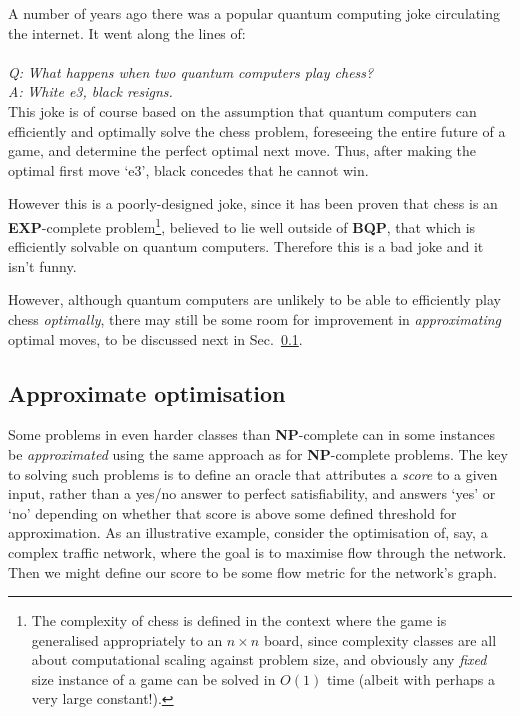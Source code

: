 A number of years ago there was a popular quantum computing joke circulating the internet. It went along the lines of:
\\
\\
\textit{Q:\,\,What happens when two quantum computers play chess?}\\
\textit{A:\,\,White e3, black resigns.}
\\

This joke is of course based on the assumption that quantum computers can efficiently and optimally solve the chess problem, foreseeing the entire future of a game, and determine the perfect optimal next move. Thus, after making the optimal first move `e3', black concedes that he cannot win.

However this is a poorly-designed joke, since it has been proven that chess is an \textbf{EXP}-complete problem\footnote{The complexity of chess is defined in the context where the game is generalised appropriately to an \mbox{$n\times n$} board, since complexity classes are all about computational scaling against problem size, and obviously any \textit{fixed} size instance of a game can be solved in $O(1)$ time (albeit with perhaps a very large constant!).}, believed to lie well outside of \textbf{BQP}, that which is efficiently solvable on quantum computers. Therefore this is a bad joke and it isn't funny.

However, although quantum computers are unlikely to be able to efficiently play chess \textit{optimally}, there may still be some room for improvement in \textit{approximating} optimal moves, to be discussed next in Sec.~\ref{sec:approx_optim}.

\subsection{Approximate optimisation}\label{sec:approx_optim}

Some problems in even harder classes than \textbf{NP}-complete can in some instances be \textit{approximated} using the same approach as for \textbf{NP}-complete problems. The key to solving such problems is to define an oracle that attributes a \textit{score} to a given input, rather than a yes/no answer to perfect satisfiability, and answers `yes' or `no' depending on whether that score is above some defined threshold for approximation. As an illustrative example, consider the optimisation of, say, a complex traffic network, where the goal is to maximise flow through the network. Then we might define our score to be some flow metric for the network's graph.

